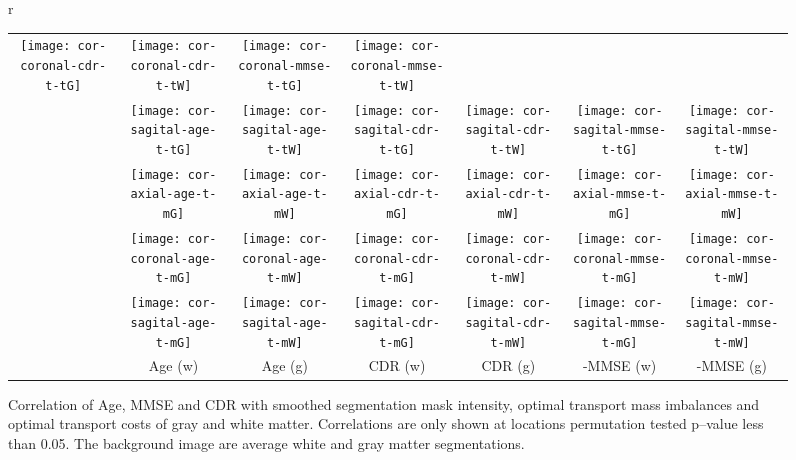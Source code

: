 \documentclass{llncs}
\begin{document}
\begin{figure}[!h]
\begin{tabular}{r}
\begin{tabular}{c|cc||cc||cc}
\texttt{[image: cor-coronal-cdr-t-tG]} &
\texttt{[image: cor-coronal-cdr-t-tW]} &
\texttt{[image: cor-coronal-mmse-t-tG]} &
\texttt{[image: cor-coronal-mmse-t-tW]} \\ 
&
\texttt{[image: cor-sagital-age-t-tG]} &
\texttt{[image: cor-sagital-age-t-tW]} &
\texttt{[image: cor-sagital-cdr-t-tG]} &
\texttt{[image: cor-sagital-cdr-t-tW]} &
\texttt{[image: cor-sagital-mmse-t-tG]} &
\texttt{[image: cor-sagital-mmse-t-tW]} \\ 
  \hline 
  \hline
  \raisebox{1mm}{ \multirow{3}{4mm}{ \rotatebox[origin=c]{90}{UTM Mass} }} &
\texttt{[image: cor-axial-age-t-mG]} &
\texttt{[image: cor-axial-age-t-mW]} &
\texttt{[image: cor-axial-cdr-t-mG]} &
\texttt{[image: cor-axial-cdr-t-mW]} &
\texttt{[image: cor-axial-mmse-t-mG]} &
\texttt{[image: cor-axial-mmse-t-mW]} \\ 
        &
\texttt{[image: cor-coronal-age-t-mG]} &
\texttt{[image: cor-coronal-age-t-mW]} &
\texttt{[image: cor-coronal-cdr-t-mG]} &
\texttt{[image: cor-coronal-cdr-t-mW]} &
\texttt{[image: cor-coronal-mmse-t-mG]} &
\texttt{[image: cor-coronal-mmse-t-mW]} \\ 
        &
\texttt{[image: cor-sagital-age-t-mG]} &
\texttt{[image: cor-sagital-age-t-mW]} &
\texttt{[image: cor-sagital-cdr-t-mG]} &
\texttt{[image: cor-sagital-cdr-t-mW]} &
\texttt{[image: cor-sagital-mmse-t-mG]} &
\texttt{[image: cor-sagital-mmse-t-mW]} \\ 

\hline \hline
& \parbox[b][3mm]{12mm}{Age (w)} 
& \parbox[b][3mm]{12mm}{Age (g)} 
& \parbox[b][3mm]{15mm}{CDR (w)} 
& \parbox[b][3mm]{15mm}{CDR (g) }
& \parbox[b][3mm]{15mm}{-MMSE (w)}
& \parbox[b][3mm]{15mm}{-MMSE (g)}
\end{tabular}
\end{tabular}
\caption{\label{fig:cor-oasis}
Correlation of Age, MMSE and CDR with smoothed segmentation mask intensity,
optimal transport mass imbalances and optimal transport costs of gray and white
matter.  Correlations are only shown at locations permutation tested p--value
less than 0.05. The background image are average white and gray matter
segmentations.
\vspace{-5mm}
} 
\end{figure} \endgroup
\end{document}
